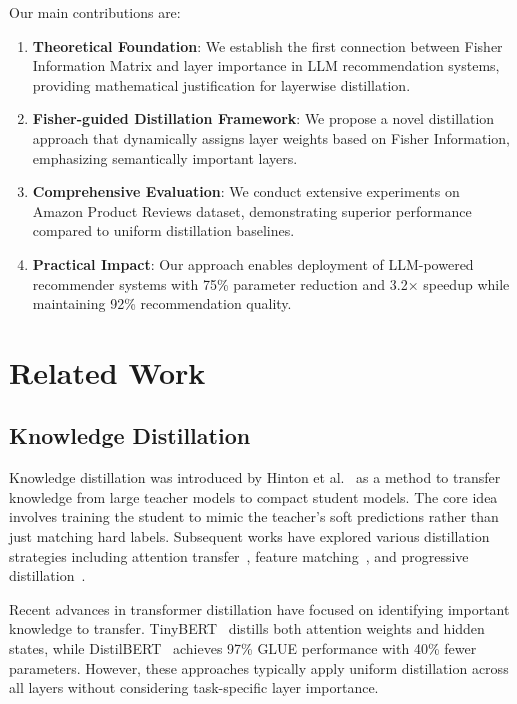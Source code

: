 \documentclass[10pt,conference]{IEEEtran}
\begin{document}
Our main contributions are:

\begin{enumerate}
    \item \textbf{Theoretical Foundation}: We establish the first connection between Fisher Information Matrix and layer importance in LLM recommendation systems, providing mathematical justification for layerwise distillation.
    
    \item \textbf{Fisher-guided Distillation Framework}: We propose a novel distillation approach that dynamically assigns layer weights based on Fisher Information, emphasizing semantically important layers.
    
    \item \textbf{Comprehensive Evaluation}: We conduct extensive experiments on Amazon Product Reviews dataset, demonstrating superior performance compared to uniform distillation baselines.
    
    \item \textbf{Practical Impact}: Our approach enables deployment of LLM-powered recommender systems with 75\% parameter reduction and 3.2× speedup while maintaining 92\% recommendation quality.
\end{enumerate}

\section{Related Work}

\subsection{Knowledge Distillation}

Knowledge distillation was introduced by Hinton et al.~\cite{hinton2015distilling} as a method to transfer knowledge from large teacher models to compact student models. The core idea involves training the student to mimic the teacher's soft predictions rather than just matching hard labels. Subsequent works have explored various distillation strategies including attention transfer~\cite{zagoruyko2016attention}, feature matching~\cite{romero2014fitnets}, and progressive distillation~\cite{sun2019patient}.

Recent advances in transformer distillation have focused on identifying important knowledge to transfer. TinyBERT~\cite{jiao2019tinybert} distills both attention weights and hidden states, while DistilBERT~\cite{sanh2019distilbert} achieves 97\% GLUE performance with 40\% fewer parameters. However, these approaches typically apply uniform distillation across all layers without considering task-specific layer importance.
\end{document}
